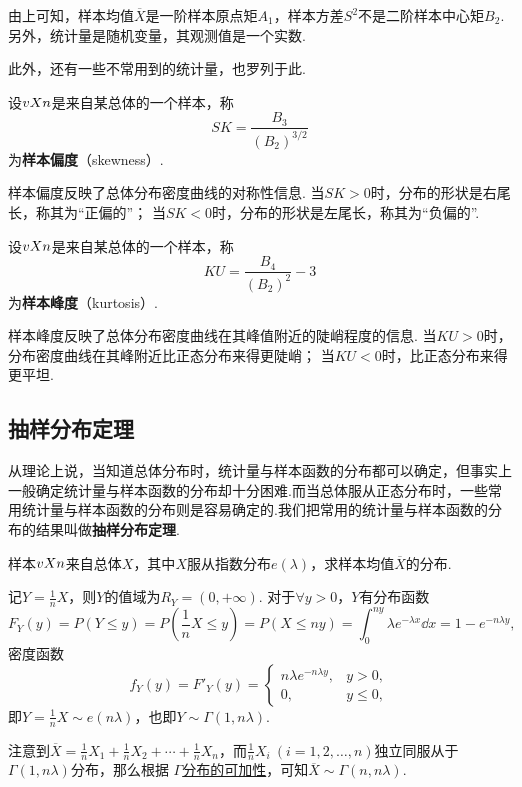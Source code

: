 由上可知，样本均值\(\overline{X}\)是一阶样本原点矩\(A_1\)，样本方差\(S^2\)不是二阶样本中心矩\(B_2\).
另外，统计量是随机变量，其观测值是一个实数.

此外，还有一些不常用到的统计量，也罗列于此.
\begin{definition}
设\(v{X}{n}\)是来自某总体的一个样本，称\begin{equation}
SK = \frac{B_3}{(B_2)^{3/2}}
\end{equation}为\textbf{样本偏度}（skewness）.
\end{definition}
样本偏度反映了总体分布密度曲线的对称性信息.
当\(SK > 0\)时，分布的形状是右尾长，称其为“正偏的”；
当\(SK < 0\)时，分布的形状是左尾长，称其为“负偏的”.

\begin{definition}
设\(v{X}{n}\)是来自某总体的一个样本，称\begin{equation}
KU = \frac{B_4}{(B_2)^2} - 3
\end{equation}为\textbf{样本峰度}（kurtosis）.
\end{definition}
样本峰度反映了总体分布密度曲线在其峰值附近的陡峭程度的信息.
当\(KU > 0\)时，分布密度曲线在其峰附近比正态分布来得更陡峭；
当\(KU < 0\)时，比正态分布来得更平坦.

\subsection{抽样分布定理}
从理论上说，当知道总体分布时，统计量与样本函数的分布都可以确定，但事实上一般确定统计量与样本函数的分布却十分困难.而当总体服从正态分布时，一些常用统计量与样本函数的分布则是容易确定的.我们把常用的统计量与样本函数的分布的结果叫做\textbf{抽样分布定理}.

\begin{example}
样本\(v{X}{n}\)来自总体\(X\)，其中\(X\)服从指数分布\(e(\lambda)\)，求样本均值\(\overline{X}\)的分布.
\begin{solution}
记\(Y = \frac{1}{n} X\)，则\(Y\)的值域为\(R_Y = (0,+\infty)\).
对于\(\forall y>0\)，\(Y\)有分布函数\[
F_Y(y) = P(Y \leqslant y)
= P\left(\frac{1}{n} X \leqslant y\right)
= P(X \leqslant ny)
= \int_0^{ny} \lambda e^{-\lambda x} \dd{x}
= 1 - e^{-n\lambda y},
\]密度函数\[
f_Y(y) = F'_Y(y) = \left\{ \begin{array}{lc}
n\lambda e^{-n\lambda y}, & y>0, \\
0, & y \leqslant 0,
\end{array} \right.
\]即\(Y=\frac{1}{n}X \sim e(n\lambda)\)，也即\(Y \sim \Gamma(1,n\lambda)\).

注意到\(\overline{X} = \frac{1}{n} X_1 + \frac{1}{n} X_2 + \dotsb + \frac{1}{n} X_n\)，而\(\frac{1}{n} X_i\ (i=1,2,\dotsc,n)\)独立同服从于\(\Gamma(1,n\lambda)\)分布，那么根据 \hyperref[theorem:多维随机变量及其分布.伽马分布的可加性1]{\(\Gamma\)分布的可加性}，可知\(\overline{X} \sim \Gamma(n,n\lambda)\).
\end{solution}
\end{example}

